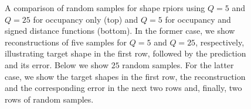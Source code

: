 \begin{figure}
  \caption{A comparison of random samples for \VAE shape rpiors using $Q = 5$
  and $Q = 25$ for occupancy only
  (top) and $Q = 5$ for occupancy and signed distance functions (bottom).
  In the former case, we show reconstructions of five samples for $Q = 5$
  and $Q = 25$, respectively, illustrating target shape in the first row,
  followed by the prediction and its error. Below we show $25$ random samples.
  For the latter case, we show the target shapes in the first row,
  the reconstruction and the corresponding error
  in the next two rows and, finally, two rows of random samples.}
  \label{fig:experiments-2d-vae-occ-random}
\end{figure}
